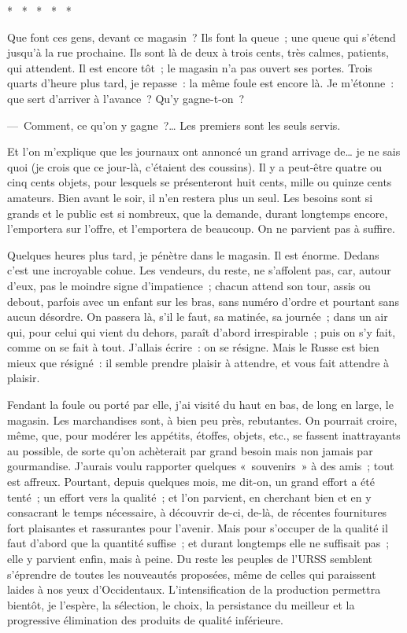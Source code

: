 \documentclass[french,twoside]{book} %
\begin{document}
\begin{center}
\noindent \centerline{*  *  *  *  *}\par
\end{center}

\noindent Que font ces gens, devant ce magasin ? Ils font la queue ; une queue qui s’étend jusqu’à la rue prochaine. Ils sont là de deux à trois cents, très calmes, patients, qui attendent. Il est encore tôt ; le magasin n’a pas ouvert ses portes. Trois quarts d’heure plus tard, je repasse : la même foule est encore là. Je m’étonne : que sert d’arriver à l’avance ? Qu’y gagne-t-on ?\par
— Comment, ce qu’on y gagne ?… Les premiers sont les seuls servis.\par
Et l’on m’explique que les journaux ont annoncé un grand arrivage de… je ne sais quoi (je crois que ce jour-là, c’étaient des coussins). Il y a peut-être quatre ou cinq cents objets, pour lesquels se présenteront huit cents, mille ou quinze cents amateurs. Bien avant le soir, il n’en restera plus un seul. Les besoins sont si grands et le public est si nombreux, que la demande, durant longtemps encore, l’emportera sur l’offre, et l’emportera de beaucoup. On ne parvient pas à suffire.\par
Quelques heures plus tard, je pénètre dans le magasin. Il est énorme. Dedans c’est une incroyable cohue. Les vendeurs, du reste, ne s’affolent pas, car, autour d’eux, pas le moindre signe d’impatience ; chacun attend son tour, assis ou debout, parfois avec un enfant sur les bras, sans numéro d’ordre et pourtant sans aucun désordre. On passera là, s’il le faut, sa matinée, sa journée ; dans un air qui, pour celui qui vient du dehors, paraît d’abord irrespirable ; puis on s’y fait, comme on se fait à tout. J’allais écrire : on se résigne. Mais le Russe est bien mieux que résigné : il semble prendre plaisir à attendre, et vous fait attendre à plaisir.\par
Fendant la foule ou porté par elle, j’ai visité du haut en bas, de long en large, le magasin. Les marchandises sont, à bien peu près, rebutantes. On pourrait croire, même, que, pour modérer les appétits, étoffes, objets, etc., se fassent inattrayants au possible, de sorte qu’on achèterait par grand besoin mais non jamais par gourmandise. J’aurais voulu rapporter quelques « souvenirs » à des amis ; tout est affreux. Pourtant, depuis quelques mois, me dit-on, un grand effort a été tenté ; un effort vers la qualité ; et l’on parvient, en cherchant bien et en y consacrant le temps nécessaire, à découvrir de-ci, de-là, de récentes fournitures fort plaisantes et rassurantes pour l’avenir. Mais pour s’occuper de la qualité il faut d’abord que la quantité suffise ; et durant longtemps elle ne suffisait pas ; elle y parvient enfin, mais à peine. Du reste les peuples de l’URSS semblent s’éprendre de toutes les nouveautés proposées, même de celles qui paraissent laides à nos yeux d’Occidentaux. L’intensification de la production permettra bientôt, je l’espère, la sélection, le choix, la persistance du meilleur et la progressive élimination des produits de qualité inférieure.\par
\end{document}
